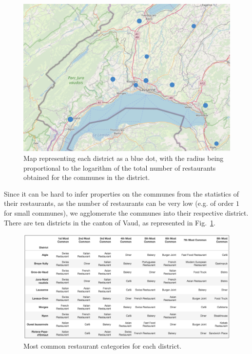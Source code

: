 \documentclass[12pt]{article}
\begin{document}
\begin{figure}
\begin{center}
\includegraphics[width=\textwidth]{Figures/Fig5}
\caption{\label{fig5} Map representing each district as a blue dot, with the radius being proportional to the logarithm of the total number of restaurants obtained for the communes in the district.}
\end{center}
\end{figure}

Since it can be hard to infer properties on the communes from the statistics of their restaurants, as the number of restaurants can be very low (e.g. of order $1$ for small communes), we agglomerate the communes into their respective district. There are ten districts in the canton of Vaud, as represented in Fig.~\ref{fig5}.

\begin{figure}
\begin{center}
\includegraphics[width=\textwidth]{Figures/Fig6}
\caption{\label{fig6} Most common restaurant categories for each district.}
\end{center}
\end{figure}
\end{document}
